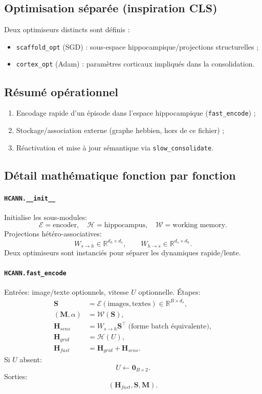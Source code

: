 \documentclass[12pt,a4paper]{article}
\begin{document}
\subsection{Optimisation séparée (inspiration CLS)}
Deux optimiseurs distincts sont définis :
\begin{itemize}
    \item \texttt{scaffold\_opt} (SGD) : sous-espace hippocampique/projections structurelles ;
    \item \texttt{cortex\_opt} (Adam) : paramètres corticaux impliqués dans la consolidation.
\end{itemize}

\subsection{Résumé opérationnel}
\begin{enumerate}
    \item Encodage rapide d'un épisode dans l'espace hippocampique (\texttt{fast\_encode}) ;
    \item Stockage/association externe (graphe hebbien, hors de ce fichier) ;
    \item Réactivation et mise à jour sémantique via \texttt{slow\_consolidate}.
\end{enumerate}

\subsection{Détail mathématique fonction par fonction}

\paragraph{\texttt{HCANN.\_\_init\_\_}}
Initialise les sous-modules:
\[
\mathcal{E}=\text{encoder},\quad \mathcal{H}=\text{hippocampus},\quad \mathcal{W}=\text{working memory}.
\]
Projections hétéro-associatives:
\[
W_{s\to h}\in\mathbb{R}^{d_h\times d_s},\qquad
W_{h\to s}\in\mathbb{R}^{d_s\times d_h}.
\]
Deux optimiseurs sont instanciés pour séparer les dynamiques rapide/lente.

\paragraph{\texttt{HCANN.fast\_encode}}
Entrées: image/texte optionnels, vitesse $U$ optionnelle.  
Étapes:
\begin{align}
\mathbf{S} &= \mathcal{E}(\text{images},\text{textes}) \in \mathbb{R}^{B\times d_s},\\
(\mathbf{M},\alpha) &= \mathcal{W}(\mathbf{S}),\\
\mathbf{H}_{sens} &= W_{s\to h}\mathbf{S}^\top \; \text{(forme batch équivalente)},\\
\mathbf{H}_{grid} &= \mathcal{H}(U),\\
\mathbf{H}_{fast} &= \mathbf{H}_{grid} + \mathbf{H}_{sens}.
\end{align}
Si $U$ absent:
\[
U\leftarrow \mathbf{0}_{B\times2}.
\]
Sorties:
\[
(\mathbf{H}_{fast},\mathbf{S},\mathbf{M}).
\]
\end{document}
